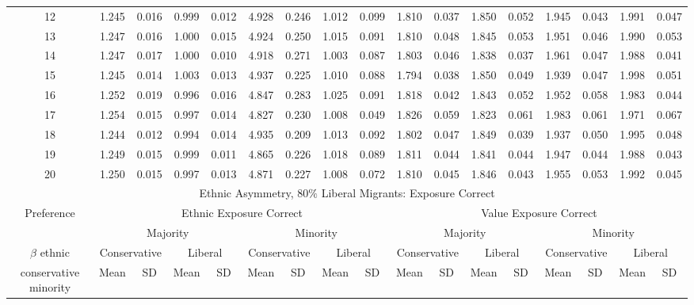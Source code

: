 \documentclass{article}
\begin{document}
\begin{table}[H]
{\begin{tabular}{|c|c|c|c|c|c|c|c|c|c|c|c|c|c|c|c|c|}
    12 & 1.245 & 0.016 & 0.999 & 0.012 & 4.928 & 0.246 & 1.012 & 0.099 & 1.810 & 0.037 & 1.850 & 0.052 & 1.945 & 0.043 & 1.991 & 0.047 \\ 
    13 & 1.247 & 0.016 & 1.000 & 0.015 & 4.924 & 0.250 & 1.015 & 0.091 & 1.810 & 0.048 & 1.845 & 0.053 & 1.951 & 0.046 & 1.990 & 0.053 \\ 
    14 & 1.247 & 0.017 & 1.000 & 0.010 & 4.918 & 0.271 & 1.003 & 0.087 & 1.803 & 0.046 & 1.838 & 0.037 & 1.961 & 0.047 & 1.988 & 0.041 \\ 
    15 & 1.245 & 0.014 & 1.003 & 0.013 & 4.937 & 0.225 & 1.010 & 0.088 & 1.794 & 0.038 & 1.850 & 0.049 & 1.939 & 0.047 & 1.998 & 0.051 \\ 
    16 & 1.252 & 0.019 & 0.996 & 0.016 & 4.847 & 0.283 & 1.025 & 0.091 & 1.818 & 0.042 & 1.843 & 0.052 & 1.952 & 0.058 & 1.983 & 0.044 \\ 
    17 & 1.254 & 0.015 & 0.997 & 0.014 & 4.827 & 0.230 & 1.008 & 0.049 & 1.826 & 0.059 & 1.823 & 0.061 & 1.983 & 0.061 & 1.971 & 0.067 \\ 
    18 & 1.244 & 0.012 & 0.994 & 0.014 & 4.935 & 0.209 & 1.013 & 0.092 & 1.802 & 0.047 & 1.849 & 0.039 & 1.937 & 0.050 & 1.995 & 0.048 \\ 
    19 & 1.249 & 0.015 & 0.999 & 0.011 & 4.865 & 0.226 & 1.018 & 0.089 & 1.811 & 0.044 & 1.841 & 0.044 & 1.947 & 0.044 & 1.988 & 0.043 \\ 
    20 & 1.250 & 0.015 & 0.997 & 0.013 & 4.871 & 0.227 & 1.008 & 0.072 & 1.810 & 0.045 & 1.846 & 0.043 & 1.955 & 0.053 & 1.992 & 0.045 \\ 
    \hline
      \multicolumn{17}{|c|}{Ethnic Asymmetry, $80 \%$ Liberal Migrants: Exposure Correct}  \\\hline
 Preference &  \multicolumn{8}{|c|}{Ethnic Exposure Correct} & \multicolumn{8}{|c|}{Value Exposure Correct}   \\\hline
 & \multicolumn{4}{|c|}{Majority} & \multicolumn{4}{|c|}{Minority}  & \multicolumn{4}{|c|}{Majority} & \multicolumn{4}{|c|}{Minority}  \\
 $\beta$ ethnic & \multicolumn{2}{|c|}{Conservative} & \multicolumn{2}{|c|}{Liberal} 
& \multicolumn{2}{|c|}{Conservative} & \multicolumn{2}{|c|}{Liberal} & \multicolumn{2}{|c|}{Conservative} & \multicolumn{2}{|c|}{Liberal} 
& \multicolumn{2}{|c|}{Conservative} & \multicolumn{2}{|c|}{Liberal}\\
 conservative minority & Mean & SD & Mean & SD & Mean & SD & Mean & SD & Mean & SD & Mean & SD & Mean & SD & Mean & SD\\
 \hline

\end{tabular}}
\end{table}
\end{document}
